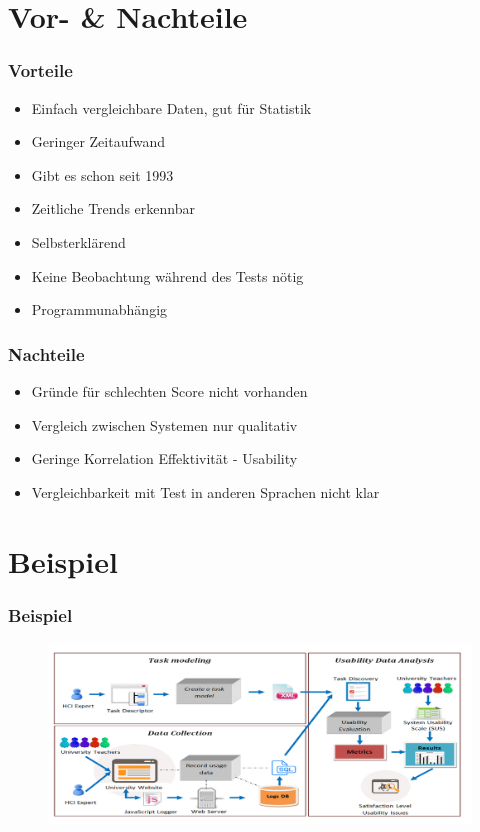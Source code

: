 \documentclass[12pt, aspectratio=169]{beamer}
\begin{document}
\section{Vor- \& Nachteile}
\begin{frame}
	\frametitle{Vorteile}
	\begin{itemize}
		\item<1> Einfach vergleichbare Daten, gut für Statistik
		\item<1> Geringer Zeitaufwand
		\item<1> Gibt es schon seit 1993
		\item<1> Zeitliche Trends erkennbar
		\item<1> Selbsterklärend
		\item<1> Keine Beobachtung während des Tests nötig
		\item<1> Programmunabhängig
	\end{itemize}
\end{frame}

\begin{frame}
	\frametitle{Nachteile}
	\begin{itemize}
		\item<1> Gründe für schlechten Score nicht vorhanden
		\item<1> Vergleich zwischen Systemen nur qualitativ
		\item<1> Geringe Korrelation Effektivität - Usability
		\item<1> Vergleichbarkeit mit Test in anderen Sprachen nicht klar
	\end{itemize}
\end{frame}

\section{Beispiel}
\begin{frame}
	\frametitle{Beispiel}
		\begin{figure}
			\centering
			\includegraphics[keepaspectratio=true, width=1\textwidth]{./image/peter.png}
			\caption{\tiny{\cite{harrati2016exploring}}}
		\end{figure}
		
\end{frame}
\end{document}
